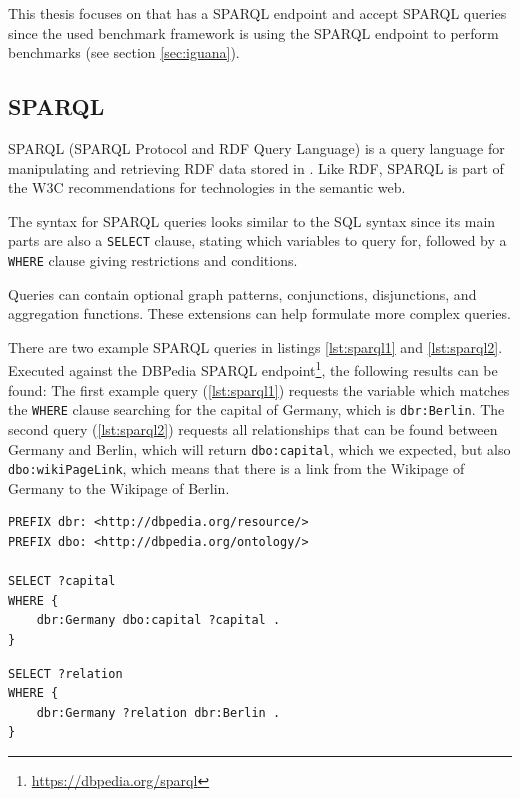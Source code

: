 This thesis focuses on \tsp{} that has a SPARQL endpoint and accept SPARQL queries since the used benchmark framework \iguana{} is using the SPARQL endpoint to perform benchmarks (see section \ref{sec:iguana}).


\subsection{SPARQL}
\label{sec:sparql}
SPARQL (SPARQL Protocol and RDF Query Language) \cite{harrisSPARQLQueryLanguage} is a query language for manipulating and retrieving RDF data stored in \tsp{}.
Like RDF, SPARQL is part of the W3C recommendations for technologies in the semantic web.

The syntax for SPARQL queries looks similar to the SQL syntax since its main parts are also a \texttt{SELECT} clause, stating which variables to query for, followed by a \texttt{WHERE} clause giving restrictions and conditions.

Queries can contain optional graph patterns, conjunctions, disjunctions, and aggregation functions.
These extensions can help formulate more complex queries.

There are two example SPARQL queries in listings \ref{lst:sparql1} and \ref{lst:sparql2}.
Executed against the DBPedia SPARQL endpoint\footnote{\url{https://dbpedia.org/sparql}}, the following results can be found:
The first example query (\ref{lst:sparql1}) requests the variable which matches the \texttt{WHERE} clause searching for the capital of Germany, which is \texttt{dbr:Berlin}.
The second query (\ref{lst:sparql2}) requests all relationships that can be found between Germany and Berlin, which will return \texttt{dbo:capital}, which we expected, but also \texttt{dbo:wikiPageLink}, which means that there is a link from the Wikipage of Germany to the Wikipage of Berlin.

\begin{lstlisting}[caption={SPARQL query searching the capital of Germany}, label=lst:sparql1]
PREFIX dbr: <http://dbpedia.org/resource/>
PREFIX dbo: <http://dbpedia.org/ontology/>

SELECT ?capital
WHERE {
	dbr:Germany dbo:capital ?capital .
}
\end{lstlisting}

\begin{lstlisting}[caption={SPARQL query searching all relations between Germany and Berlin}, label=lst:sparql2]
SELECT ?relation
WHERE {
	dbr:Germany ?relation dbr:Berlin .
}
\end{lstlisting}
